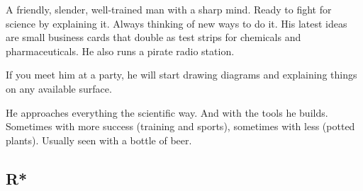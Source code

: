 \begin{npcBox}[title=N*]
    \begin{stressSection}
    \end{stressSection}
    \begin{tabularx}{\textwidth}{ XX }
    \end{tabularx}

    \begin{consequences}
    \item {}
    \item {}
    \item {}
    \end{consequences}

    \begin{npcDescription}
    A friendly, slender, well-trained man with a sharp mind. Ready to fight for science by explaining it. Always thinking of new ways to do it. His latest ideas are small business cards that double as test strips for chemicals and pharmaceuticals. He also runs a pirate radio station.

    If you meet him at a party, he will start drawing diagrams and explaining things on any available surface.

    He approaches everything the scientific way. And with the tools he builds. Sometimes with more success (training and sports), sometimes with less (potted plants).
    Usually seen with a bottle of beer.

    \end{npcDescription}

\end{npcBox}

\subsection{R*}

